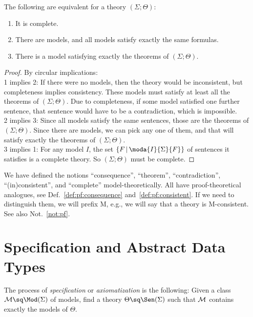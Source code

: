 \begin{lemma}\label{lem:mod:complete}
The following are equivalent for a theory $(\Sigma;\Theta)$:
\begin{enumerate}
	\item It is complete.
	\item There are models, and all models satisfy exactly the same formulas.
	\item There is a model satisfying exactly the theorems of $(\Sigma;\Theta)$.
\end{enumerate}
\end{lemma}
\begin{proof}By circular implications: \\
1 implies 2: If there were no models, then the theory would be inconsistent, but completeness implies consistency. These models must satisfy at least all the theorems of $(\Sigma;\Theta)$. Due to completeness, if some model satisfied one further sentence, that sentence would have to be a contradiction, which is impossible. \\
2 implies 3: Since all models satisfy the same sentences, those are the theorems of $(\Sigma;\Theta)$. Since there are models, we can pick any one of them, and that will satisfy exactly the theorems of $(\Sigma;\Theta)$. \\
3 implies 1: For any model $I$, the set $\{F\|\moda{I}{\Sigma}{F}\}$ of sentences it satisfies is a complete theory. So $(\Sigma;\Theta)$ must be complete.
\end{proof}

\begin{notation}\label{not:mod}
We have defined the notions ``consequence'', ``theorem'', ``contradiction'', ``(in)consistent'', and ``complete'' model-theoretically. All have proof-theoretical analogues, see Def.~\ref{def:pf:consequence} and~\ref{def:pf:consistent}. If we need to distinguish them, we will prefix M, e.g., we will say that a theory is M-consistent. See also Not.~\ref{not:pf}.
\end{notation}

\section{Specification and Abstract Data Types}

The process of \emph{specification} or \emph{axiomatization} is the following: Given a class $\sM\sq\Mod(\Sigma)$ of models, find a theory $\Theta\sq\Sen(\Sigma)$ such that ${\cal M}$ contains exactly the models of $\Theta$.

